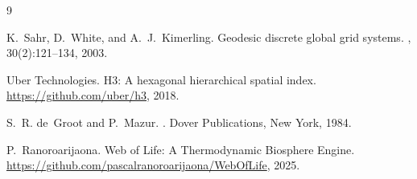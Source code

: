 \documentclass[11pt,a4paper]{article}
\theoremstyle{definition}
\begin{document}

\begin{thebibliography}{9}

K.~Sahr, D.~White, and A.~J.~Kimerling.
\newblock Geodesic discrete global grid systems.
, 30(2):121--134, 2003.

Uber Technologies.
\newblock H3: A hexagonal hierarchical spatial index.
\newblock \url{https://github.com/uber/h3}, 2018.

S.~R. de~Groot and P.~Mazur.
.
\newblock Dover Publications, New York, 1984.

P.~Ranoroarijaona.
\newblock Web of Life: A Thermodynamic Biosphere Engine.
\newblock \url{https://github.com/pascalranoroarijaona/WebOfLife}, 2025.

\end{thebibliography}
\end{document}
